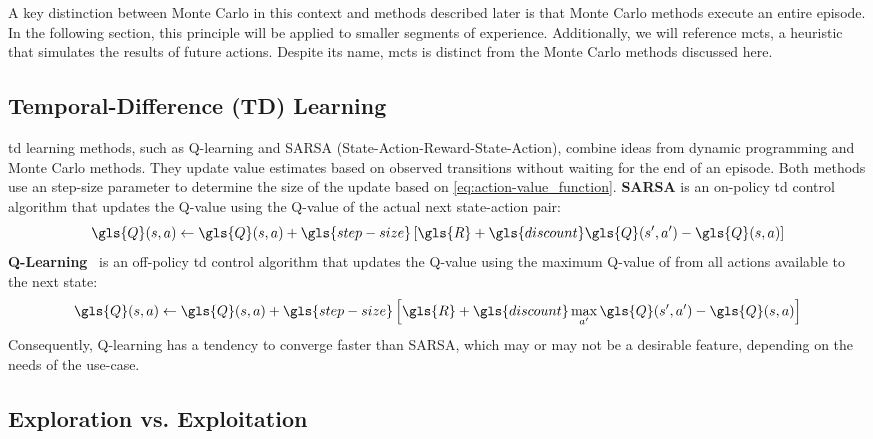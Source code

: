 A key distinction between Monte Carlo in this context and methods described 
later is that Monte Carlo methods execute an entire episode. In the following 
section, this principle will be applied to smaller segments of experience. 
Additionally, we will reference \gls{mcts}, 
a heuristic that simulates the results of future actions. Despite its name, 
\gls{mcts} is distinct from the Monte Carlo methods discussed here.

    \subsection*{Temporal-Difference (TD) Learning}%

\Gls{td} learning methods, such as Q-learning and SARSA 
(State-Action-Reward-State-Action), combine ideas from 
dynamic programming and Monte Carlo methods. They update value estimates 
based on observed transitions without waiting for the end of an episode.
Both methods use an \gls{step-size} parameter to determine the size of 
the update based on \cref{eq:action-value_function}.
%
\textbf{SARSA} is an on-policy \gls{td} control algorithm that updates the 
\gls{Q}-value using the \gls{Q}-value of the actual next state-action pair:
%
\begin{equation}
    \gls{Q}(s, a) \leftarrow \gls{Q}(s, a) + \gls{step-size} \left[ 
        \gls{R} + \gls{discount} \gls{Q}(s^\prime, a^\prime) - \gls{Q}(s, a) 
    \right]
    \label{eq:sarsa_action-value}
\end{equation}
%
\textbf{Q-Learning}~\cite{watkins1992} is an off-policy \gls{td} control 
algorithm that updates the \gls{Q}-value using the maximum \gls{Q}-value of 
from all actions available to the next state:
%
\begin{equation}
    \gls{Q}(s, a) \leftarrow \gls{Q}(s, a) + \gls{step-size} \left[ 
        \gls{R} + \gls{discount} \max_{a^\prime} 
        \gls{Q}(s^\prime, a^\prime) - \gls{Q}(s, a)
    \right]
    \label{eq:q-learning_action-value}
\end{equation}
%
Consequently, Q-learning has a tendency to converge faster than SARSA,
which may or may not be a desirable feature, depending on the needs
of the use-case.

    \subsection*{Exploration vs. Exploitation}

